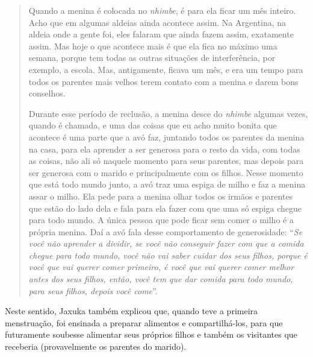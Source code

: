 \begin{quote}
Quando a menina é colocada no \emph{nhimbe}, é para ela ficar um mês
inteiro. Acho que em algumas aldeias ainda acontece assim. Na Argentina,
na aldeia onde a gente foi, eles falaram que ainda fazem assim,
exatamente assim. Mas hoje o que acontece mais é que ela fica no máximo
uma semana, porque tem todas as outras situações de interferência, por
exemplo, a escola. Mas, antigamente, ficava um mês, e era um tempo para
todos os parentes mais velhos terem contato com a menina e darem bons
conselhos.

Durante esse período de reclusão, a menina desce do \emph{nhimbe}
algumas vezes, quando é chamada, e uma das coisas que eu acho muito
bonita que acontece é uma parte que a avó faz, juntando todos os
parentes da menina na casa, para ela aprender a ser generosa para o
resto da vida, com todas as coisas, não ali só naquele momento para seus
parentes, mas depois para ser generosa com o marido e principalmente com
os filhos. Nesse momento que está todo mundo junto, a avó traz uma
espiga de milho e faz a menina assar o milho. Ela pede para a menina
olhar todos os irmãos e parentes que estão do lado dela e fala para ela
fazer com que uma só espiga chegue para todo mundo. A única pessoa que
pode ficar sem comer o milho é a própria menina. Daí a avó fala desse
comportamento de generosidade: ``\emph{Se você não aprender a dividir,
se você não conseguir fazer com que a comida chegue para todo mundo,
você não vai saber cuidar dos seus filhos, porque é você que vai querer
comer primeiro, é você que vai querer comer melhor antes dos seus
filhos, então, você tem que dar comida para todo mundo, para seus
filhos, depois você come}''.
\end{quote}

Neste sentido, Jaxuka também explicou que, quando teve a primeira
menstruação, foi ensinada a preparar alimentos e compartilhá-los, para
que futuramente soubesse alimentar seus próprios filhos e também os
visitantes que receberia (provavelmente os parentes do marido).

